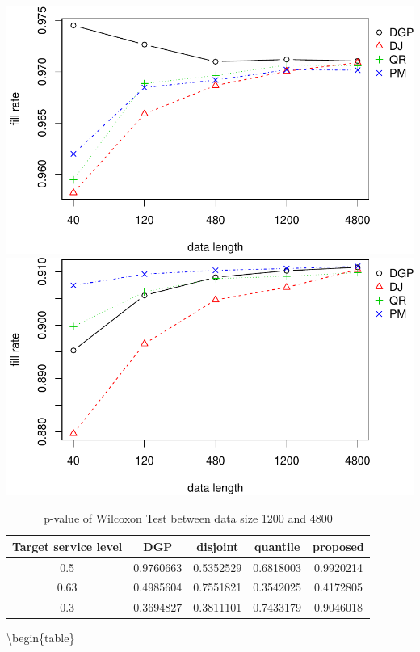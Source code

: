 \documentclass[
]{article}
\begin{document}
\includegraphics{linear-norm-plot_files/figure-latex/fr-2.pdf}
\includegraphics{linear-norm-plot_files/figure-latex/fr-3.pdf}

\begin{table}

\caption{\label{tab:Wilcoxon}p-value of Wilcoxon Test between data size 1200 and 4800}
\centering
\begin{tabular}[t]{ccccc}
\toprule
Target service level & DGP & disjoint & quantile & proposed\\
\midrule
\rowcolor{gray!6}  0.5 & 0.9760663 & 0.5352529 & 0.6818003 & 0.9920214\\
0.63 & 0.4985604 & 0.7551821 & 0.3542025 & 0.4172805\\
\rowcolor{gray!6}  0.3 & 0.3694827 & 0.3811101 & 0.7433179 & 0.9046018\\
\bottomrule
\end{tabular}
\end{table}

\textbackslash begin\{table\}
\end{document}
